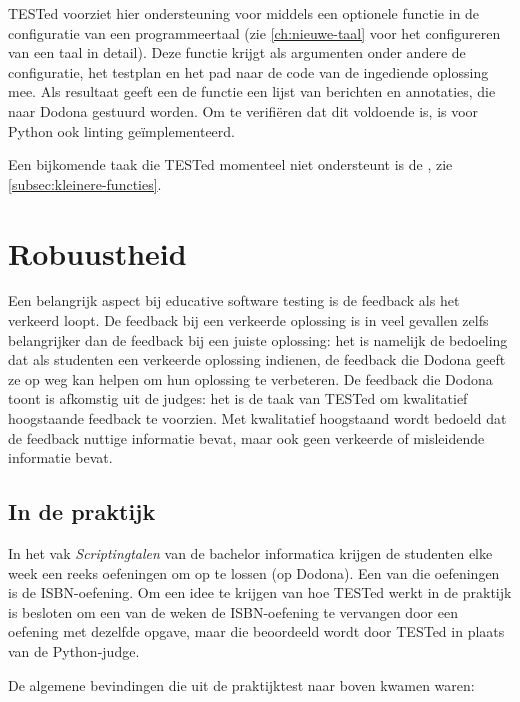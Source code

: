 TESTed voorziet hier ondersteuning voor middels een optionele functie in de configuratie van een programmeertaal (zie \cref{ch:nieuwe-taal} voor het configureren van een taal in detail).
Deze functie krijgt als argumenten onder andere de configuratie, het testplan en het pad naar de code van de ingediende oplossing mee.
Als resultaat geeft een de functie een lijst van berichten en annotaties, die naar Dodona gestuurd worden.
Om te verifiëren dat dit voldoende is, is voor Python ook linting geïmplementeerd.

Een bijkomende taak die TESTed momenteel niet ondersteunt is de , zie \cref{subsec:kleinere-functies}.

\section{Robuustheid}\label{sec:robuustheid}

Een belangrijk aspect bij educative software testing is de feedback als het verkeerd loopt.
De feedback bij een verkeerde oplossing is in veel gevallen zelfs belangrijker dan de feedback bij een juiste oplossing: het is namelijk de bedoeling dat als studenten een verkeerde oplossing indienen, de feedback die Dodona geeft ze op weg kan helpen om hun oplossing te verbeteren.
De feedback die Dodona toont is afkomstig uit de judges: het is de taak van TESTed om kwalitatief hoogstaande feedback te voorzien.
Met kwalitatief hoogstaand wordt bedoeld dat de feedback nuttige informatie bevat, maar ook geen verkeerde of misleidende informatie bevat.

\subsection{In de praktijk}\label{subsec:in-de-praktijk}

In het vak \emph{Scriptingtalen} van de bachelor informatica krijgen de studenten elke week een reeks oefeningen om op te lossen (op Dodona).
Een van die oefeningen is de ISBN-oefening.
Om een idee te krijgen van hoe TESTed werkt in de praktijk is besloten om een van de weken de ISBN-oefening te vervangen door een oefening met dezelfde opgave, maar die beoordeeld wordt door TESTed in plaats van de Python-judge.

De algemene bevindingen die uit de praktijktest naar boven kwamen waren:


